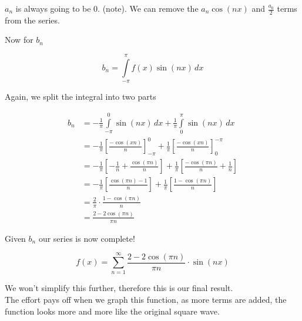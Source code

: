 \documentclass{article}
\newcommand{\integral}[4]{\int\limits_{#1}^{#2} #3\,d#4}
\begin{document}
\(a_n\) is always going to be 0. (note). We can remove the \(a_n \cos(nx)\) and \(\frac{a_0}{2}\) terms from the series.

Now for \(b_n\)

\[
    b_n=\integral{-\pi}{\pi}{f(x)\sin(nx)}{x}
\]

Again, we split the integral into two parts

\begin{align*}
    b_n &=
    -\frac{1}{\pi} \integral{-\pi}{0}{\sin(nx)}{x} +
    \frac{1}{\pi} \integral{0}{\pi}{\sin(nx)}{x} \\
    &= -\frac{1}{\pi} {\left[\frac{-\cos(xn)}{n}\right]}_{-\pi}^{0} +
    \frac{1}{\pi} {\left[\frac{-\cos(xn)}{n}\right]}_{0}^{-\pi} \\
    &= -\frac{1}{\pi} \left[-\frac{1}{n}+\frac{\cos(\pi n)}{n}\right] +
    \frac{1}{\pi} \left[\frac{-\cos(\pi n)}{n}+\frac{1}{n}\right] \\
    &= -\frac{1}{\pi} \left[\frac{\cos(\pi n)-1}{n}\right] +
    \frac{1}{\pi} \left[\frac{1-\cos(\pi n)}{n}\right] \\
    &= \frac{2}{\pi} \cdot \frac{1-\cos(\pi n)}{n} \\
    &= \frac{2-2\cos(\pi n)}{\pi n}
\end{align*}

Given \(b_n\) our series is now complete!

\[
    f(x)=\sum_{n=1}^{\infty} \frac{2-2\cos(\pi n)}{\pi n} \cdot \sin(nx)
\]

We won't simplify this further, therefore this is our final result. \\
The effort pays off when we graph this function, as more terms are added, the function looks more and more like the original square wave.

\end{document}
